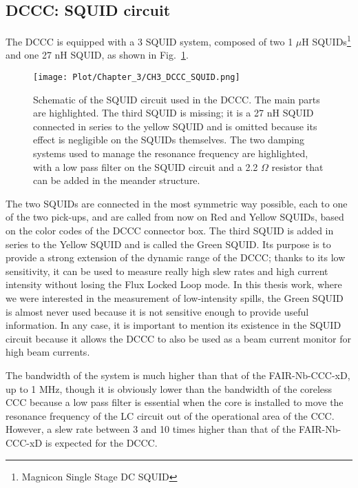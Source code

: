 \documentclass[12pt,a4paper]{report}
\begin{document}
       \subsection{DCCC: SQUID circuit}
       The DCCC is equipped with a 3 SQUID system, composed of two 1 $\mu$H SQUIDs\footnote{Magnicon Single Stage DC SQUID} and one 27 nH SQUID, as shown in Fig.~\ref{CH3_DCCC_SQUID_Circuit}.
       
       \begin{figure}[H]
       	\centering
       	\texttt{[image: Plot/Chapter\_3/CH3\_DCCC\_SQUID.png]}
       	\caption{\small{Schematic of the SQUID circuit used in the DCCC. The main parts are highlighted. The third SQUID is missing; it is a 27 nH SQUID connected in series to the yellow SQUID and is omitted because its effect is negligible on the SQUIDs themselves. The two damping systems used to manage the resonance frequency are highlighted, with a low pass filter on the SQUID circuit and a 2.2 $\Omega$ resistor that can be added in the meander structure.}}
       	\label{CH3_DCCC_SQUID_Circuit}
       \end{figure}
       
       The two SQUIDs are connected in the most symmetric way possible, each to one of the two pick-ups, and are called from now on Red and Yellow SQUIDs, based on the color codes of the DCCC connector box. The third SQUID is added in series to the Yellow SQUID and is called the Green SQUID. Its purpose is to provide a strong extension of the dynamic range of the DCCC; thanks to its low sensitivity, it can be used to measure really high slew rates and high current intensity without losing the Flux Locked Loop mode. In this thesis work, where we were interested in the measurement of low-intensity spills, the Green SQUID is almost never used because it is not sensitive enough to provide useful information. In any case, it is important to mention its existence in the SQUID circuit because it allows the DCCC to also be used as a beam current monitor for high beam currents.
       
       The bandwidth of the system is much higher than that of the FAIR-Nb-CCC-xD, up to 1 MHz, though it is obviously lower than the bandwidth of the coreless CCC because a low pass filter is essential when the core is installed to move the resonance frequency of the LC circuit out of the operational area of the CCC. However, a slew rate between 3 and 10 times higher than that of the FAIR-Nb-CCC-xD is expected for the DCCC.
       
\end{document}
